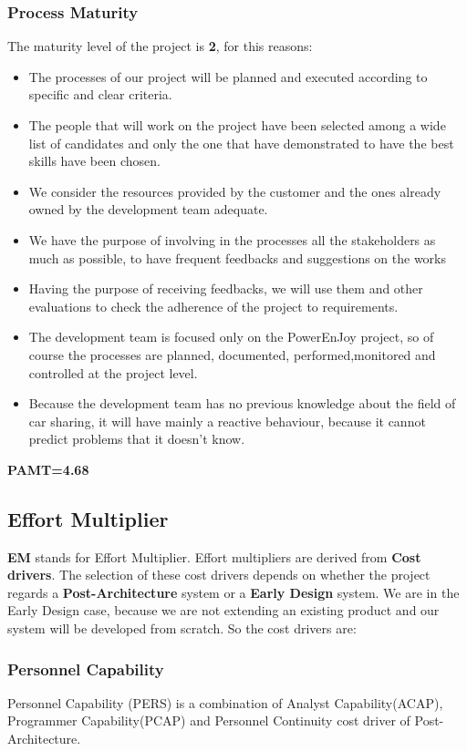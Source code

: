 \subsubsection{Process Maturity}
The maturity level of the project is \textbf{2}, for this reasons:

\begin{itemize}
	\item The processes of our project will be planned and executed according to specific and clear criteria. 
	\item The people that will work on the project have been selected among a wide list of candidates and only the one that have demonstrated to have the best skills have been chosen.
	\item We consider the resources provided by the customer and the ones already owned by the development team adequate.
	\item We have the purpose of involving in the processes all the stakeholders as much as possible, to have frequent feedbacks and suggestions on the works
	\item Having the purpose of receiving feedbacks, we will use them and other evaluations to check the adherence of the project to requirements.
	\item The development team is focused only on the PowerEnJoy project, so of course the processes are planned, documented, performed,monitored and controlled at the project level.
	\item Because the development team has no previous knowledge about the field of car sharing, it will have mainly a reactive behaviour, because it cannot predict problems that it doesn't know.  
\end{itemize}  
\textbf{PAMT=4.68}

\pagebreak
\subsection{Effort Multiplier}
\textbf{EM} stands for Effort Multiplier. Effort multipliers are derived from \textbf{Cost drivers}. The selection of these cost drivers depends on whether the project regards a \textbf{Post-Architecture} system or a \textbf{Early Design} system. We are in the Early Design case, because we are not extending an existing product and our system will be developed from scratch. So the cost drivers are:

\subsubsection{Personnel Capability}
Personnel Capability (PERS) is a combination of Analyst Capability(ACAP), Programmer Capability(PCAP) and Personnel Continuity cost driver of Post-Architecture.

